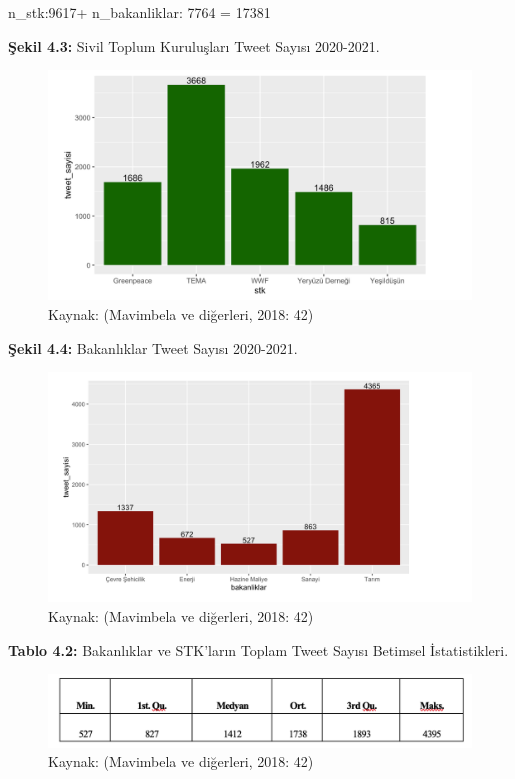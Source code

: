 \documentclass[
]{book}
\begin{document}
n\_stk:9617+ n\_bakanliklar: 7764 = 17381

\textbf{Şekil 4.3:} Sivil Toplum Kuruluşları Tweet Sayısı 2020-2021.

\begin{figure}
\includegraphics[width=0.95\linewidth,height=0.95\textheight]{tablolar-sekiller/sekil-4-3} \caption{Kaynak: (Mavimbela ve diğerleri, 2018: 42)}\label{fig:unnamed-chunk-4}
\end{figure}

\textbf{Şekil 4.4:} Bakanlıklar Tweet Sayısı 2020-2021.

\begin{figure}
\includegraphics[width=0.95\linewidth,height=0.95\textheight]{tablolar-sekiller/sekil-4-4} \caption{Kaynak: (Mavimbela ve diğerleri, 2018: 42)}\label{fig:unnamed-chunk-5}
\end{figure}

\textbf{Tablo 4.2:} Bakanlıklar ve STK'ların Toplam Tweet Sayısı Betimsel İstatistikleri.

\begin{figure}
\includegraphics[width=0.95\linewidth,height=0.95\textheight]{tablolar-sekiller/tablo-4-2} \caption{Kaynak: (Mavimbela ve diğerleri, 2018: 42)}\label{fig:unnamed-chunk-6}
\end{figure}
\end{document}
